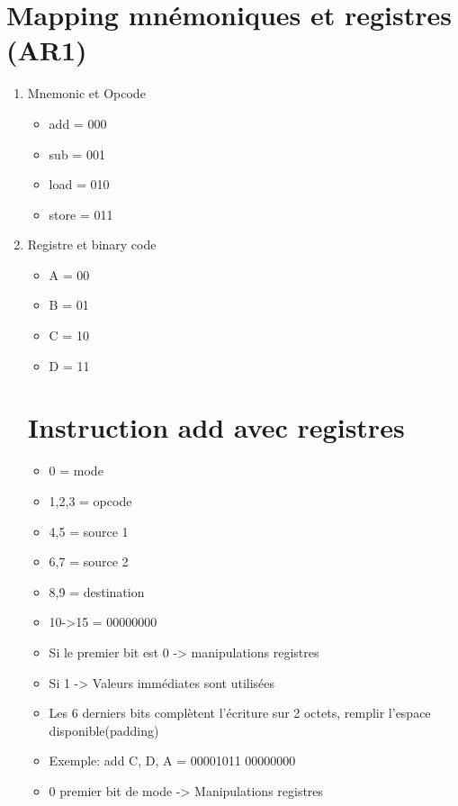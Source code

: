 \section{Mapping mnémoniques et registres (AR1)}
\begin{enumerate}
\item Mnemonic et Opcode
\begin{itemize}
  \item add = 000
  \item sub = 001
  \item load = 010
  \item store = 011
\end{itemize}
\item Registre et binary code
\begin{itemize}
  \item A = 00
  \item B = 01
  \item C = 10
  \item D = 11
\end{itemize}
\section{Instruction add avec registres}
\begin{itemize}
  \item 0 = mode
  \item 1,2,3 = opcode
  \item 4,5 = source 1 
  \item 6,7 = source 2
  \item 8,9 = destination
  \item 10->15 = 00000000
\end{itemize}
\begin{itemize}
  \item Si le premier bit est 0 -> manipulations registres
  \item Si 1 -> Valeurs immédiates sont utilisées
  \item Les 6 derniers bits complètent l'écriture sur 2 octets, remplir l'espace disponible(padding)
  \item Exemple: add C, D, A = 00001011 00000000
  \item 0 premier bit de mode -> Manipulations registres
\end{itemize}

\end{enumerate}
